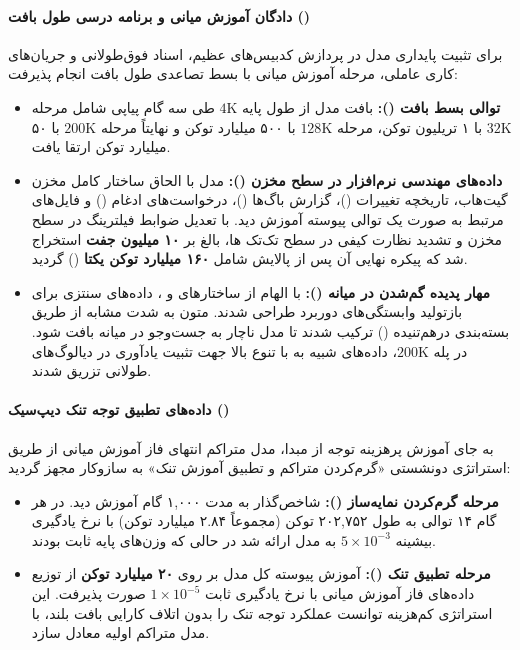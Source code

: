 \paragraph*{دادگان آموزش میانی و برنامه درسی طول بافت ()}
برای تثبیت پایداری مدل در پردازش کدبیس‌های عظیم، اسناد فوق‌طولانی و جریان‌های کاری عاملی، مرحله آموزش میانی با بسط تصاعدی طول بافت انجام پذیرفت:
\begin{itemize}
    \item \textbf{توالی بسط بافت ():} بافت مدل از طول پایه $4\text{K}$ طی سه گام پیاپی شامل مرحله $32\text{K}$ با ۱ تریلیون توکن، مرحله $128\text{K}$ با ۵۰۰ میلیارد توکن و نهایتاً مرحله $200\text{K}$ با ۵۰ میلیارد توکن ارتقا یافت.
    \item \textbf{داده‌های مهندسی نرم‌افزار در سطح مخزن ():} مدل با الحاق ساختار کامل مخزن گیت‌هاب، تاریخچه تغییرات ()، گزارش باگ‌ها ()، درخواست‌های ادغام () و فایل‌های مرتبط به صورت یک توالی پیوسته آموزش دید. با تعدیل ضوابط فیلترینگ در سطح مخزن و تشدید نظارت کیفی در سطح تک‌تک ها، بالغ بر \textbf{۱۰ میلیون جفت } استخراج شد که پیکره نهایی آن پس از پالایش شامل \textbf{۱۶۰ میلیارد توکن یکتا} () گردید.
    \item \textbf{مهار پدیده گم‌شدن در میانه ():} با الهام از ساختارهای  \cite{gao2025nextlong} و  \cite{jia2025entropylong}، داده‌های سنتزی برای بازتولید وابستگی‌های دوربرد طراحی شدند. متون به شدت مشابه از طریق بسته‌بندی درهم‌تنیده () ترکیب شدند تا مدل ناچار به جست‌وجو در میانه بافت شود. در پله $200\text{K}$، داده‌های شبیه به  \cite{mrcr2024} با تنوع بالا جهت تثبیت یادآوری در دیالوگ‌های طولانی تزریق شدند.
\end{itemize}

\paragraph*{داده‌های تطبیق توجه تنک دیپ‌سیک ()}
به جای آموزش پرهزینه توجه از مبدا، مدل متراکم انتهای فاز آموزش میانی از طریق استراتژی دونشستی «گرم‌کردن متراکم و تطبیق آموزش تنک» به سازوکار  \cite{deepseek2025v32} مجهز گردید:
\begin{itemize}
    \item \textbf{مرحله گرم‌کردن نمایه‌ساز ():} شاخص‌گذار  به مدت ۱,۰۰۰ گام آموزش دید. در هر گام ۱۴ توالی به طول ۲۰۲,۷۵۲ توکن (مجموعاً ۲.۸۴ میلیارد توکن) با نرخ یادگیری بیشینه $5 \times 10^{-3}$ به مدل ارائه شد در حالی که وزن‌های پایه ثابت بودند.
    \item \textbf{مرحله تطبیق تنک ():} آموزش پیوسته کل مدل بر روی \textbf{۲۰ میلیارد توکن} از توزیع داده‌های فاز آموزش میانی با نرخ یادگیری ثابت $1 \times 10^{-5}$ صورت پذیرفت. این استراتژی کم‌هزینه توانست عملکرد توجه تنک را بدون اتلاف کارایی بافت بلند، با مدل متراکم اولیه معادل سازد.
\end{itemize}

